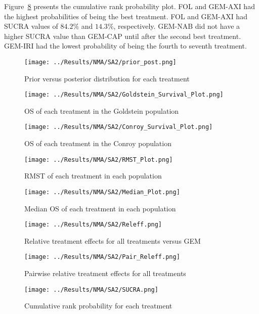 Figure~\ref{fig:sucra_SA2} presents the cumulative rank probability plot. FOL and GEM-AXI had the highest probabilities of being the best treatment. FOL and GEM-AXI had SUCRA values of $84.2\%$ and $14.3\%$, respectively. GEM-NAB did not have a higher SUCRA value than GEM-CAP until after the second best treatment. GEM-IRI had the lowest probability of being the fourth to seventh treatment. 

\begin{figure}[h]
    \centering
    \texttt{[image: ../Results/NMA/SA2/prior\_post.png]}
    \caption{Prior versus posterior distribution for each treatment}
    \label{fig:prior_post_SA2}
\end{figure}

\begin{figure}[h]
    \centering
    \texttt{[image: ../Results/NMA/SA2/Goldstein\_Survival\_Plot.png]}
    \caption{OS of each treatment in the Goldstein population}
    \label{fig:pred_surv_goldstein_SA2}
\end{figure}

\begin{figure}[h]
    \centering
    \texttt{[image: ../Results/NMA/SA2/Conroy\_Survival\_Plot.png]}
    \caption{OS of each treatment in the Conroy population}
    \label{fig:pred_surv_conroy_SA2}
\end{figure}

\begin{figure}[h]
    \centering
    \texttt{[image: ../Results/NMA/SA2/RMST\_Plot.png]}
    \caption{RMST of each treatment in each population}
    \label{fig:pred_rmst_SA2}
\end{figure}

\begin{figure}[h]
    \centering
    \texttt{[image: ../Results/NMA/SA2/Median\_Plot.png]}
    \caption{Median OS of each treatment in each population}
    \label{fig:pred_median_SA2}
\end{figure}

\begin{figure}[h]
    \centering
    \texttt{[image: ../Results/NMA/SA2/Releff.png]}
    \caption{Relative treatment effects for all treatments versus GEM}
    \label{fig:releff_SA2}
\end{figure}

\begin{figure}[h]
    \centering
    \texttt{[image: ../Results/NMA/SA2/Pair\_Releff.png]}
    \caption{Pairwise relative treatment effects for all treatments}
    \label{fig:pair_releff_SA2}
\end{figure}

\begin{figure}[h]
    \centering
    \texttt{[image: ../Results/NMA/SA2/SUCRA.png]}
    \caption{Cumulative rank probability for each treatment}
    \label{fig:sucra_SA2}
\end{figure}
